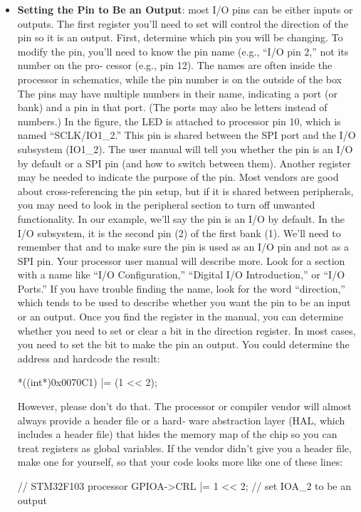 \documentclass{report}
\begin{document}
\begin{itemize}
        \item \textbf{Setting the Pin to Be an Output}: 
            most I/O pins can be either inputs or outputs. The first register you’ll need to set will control the direction of the pin so it is an output. First, determine which pin you will be changing. To modify the pin, you’ll need to know the pin name (e.g., “I/O pin 2,” not its number on the pro‐ cessor (e.g., pin 12). The names are often inside the processor in schematics, while the pin number is on the outside of the box
            \bigbreak \noindent 
            \bigbreak \noindent 
            The pins may have multiple numbers in their name, indicating a port (or bank) and a pin in that port. (The ports may also be letters instead of numbers.) In the figure, the LED is attached to processor pin 10, which is named “SCLK/IO1\_2.” This pin is shared between the SPI port
            \bigbreak \noindent 
            and the I/O subsystem (IO1\_2). The user manual will tell you whether the pin is an I/O by default or a SPI pin (and how to switch between them). Another register may be needed to indicate the purpose of the pin. Most vendors are good about cross-referencing the pin setup, but if it is shared between peripherals, you may need to look in the peripheral section to turn off unwanted functionality. In our example, we’ll say the pin is an I/O by default.
            \bigbreak \noindent 
            In the I/O subsystem, it is the second pin (2) of the first bank (1). We’ll need to remember that and to make sure the pin is used as an I/O pin and not as a SPI pin. Your processor user manual will describe more. Look for a section with a name like “I/O Configuration,” “Digital I/O Introduction,” or “I/O Ports.” If you have trouble finding the name, look for the word “direction,” which tends to be used to describe whether you want the pin to be an input or an output.
            \bigbreak \noindent 
            Once you find the register in the manual, you can determine whether you need to set or clear a bit in the direction register. In most cases, you need to set the bit to make the pin an output. You could determine the address and hardcode the result:
            \begin{cppcode}
                *((int*)0x0070C1) |= (1 << 2);
            \end{cppcode}
            However, please don’t do that. The processor or compiler vendor will almost always provide a header file or a hard‐ ware abstraction layer (HAL, which includes a header file) that hides the memory map of the chip so you can treat registers as global variables. If the vendor didn’t give you a header file, make one for yourself, so that your code looks more like one of these lines:
            \bigbreak \noindent 
            \begin{cppcode}
            // STM32F103 processor
            GPIOA->CRL |= 1 << 2; // set IOA_2 to be an output


\end{cppcode}
\end{itemize}
\end{document}
